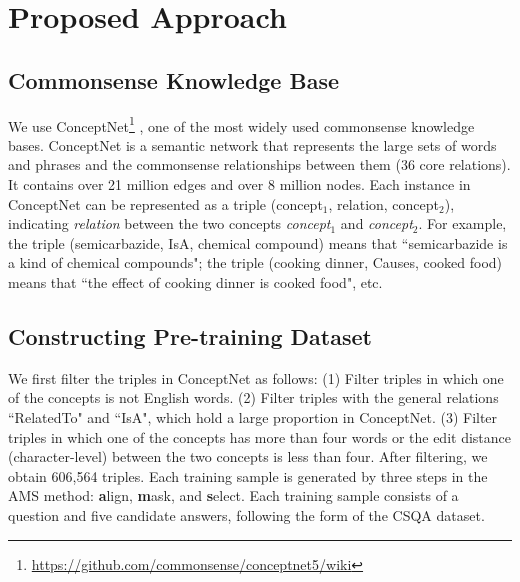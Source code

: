 \documentclass[11pt,a4paper]{article}
\begin{document}
\section{Proposed Approach}
\subsection{Commonsense Knowledge Base}
\label{sect:kb}
We use ConceptNet\footnote{\url{https://github.com/commonsense/conceptnet5/wiki}} \citep{speer2017conceptnet}, one of the most widely used commonsense knowledge bases.
ConceptNet is a semantic network that represents the large sets of words and phrases and the commonsense relationships between them (36 core relations).
It contains over 21 million edges and over 8 million nodes.
Each instance in ConceptNet can be represented as a triple 
(concept$_1$, relation, concept$_2$), indicating \textit{relation} between the two concepts \textit{concept$_1$} and \textit{concept$_2$}. 
For example, the triple (semicarbazide, IsA, chemical compound) means that ``semicarbazide is a kind of chemical compounds"; the triple (cooking dinner, Causes, cooked food) means that ``the effect of cooking dinner is cooked food", etc.

\subsection{Constructing Pre-training Dataset}
\label{sect:dataset}
We first filter the triples in ConceptNet as follows:
(1) Filter triples in which one of the concepts is not English words.
(2) Filter triples with the general relations ``RelatedTo" and ``IsA", which hold a large proportion in ConceptNet.
(3) Filter triples in which one of the concepts has more than four words or the edit distance (character-level) between the two concepts is less than four.
After filtering, we obtain 606,564 triples.
Each training sample is generated by three steps in the AMS method: \textbf{a}lign, \textbf{m}ask, and \textbf{s}elect.
Each training sample consists of a question and five candidate answers, following the form of the CSQA dataset. 
\end{document}
